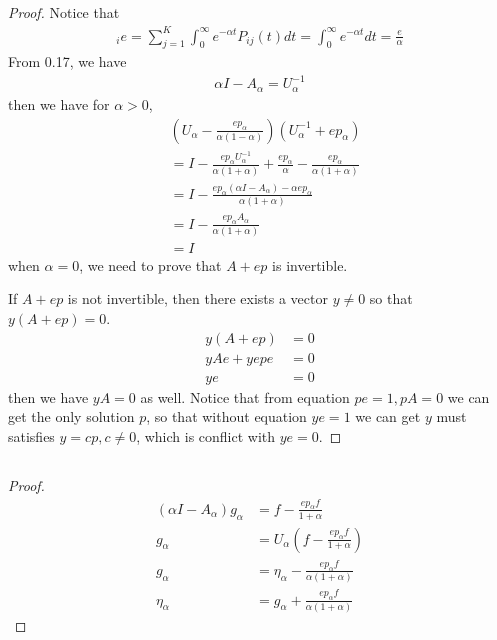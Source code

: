 \documentclass[runningheads]{llncs}
\begin{document}
    \subsection{}
    \begin{proof}
        Notice that
        \begin{align}
            [U_\alpha]_i e = \sum_{j=1}^K \int_0^\infty e^{-\alpha t} P_{ij}(t)dt = \int_0^\infty e^{-\alpha t} dt = \frac{e}{\alpha}
        \end{align}
        From 0.17, we have
        \begin{align}
            \alpha I - A_\alpha = U_\alpha^{-1}
        \end{align}
        then we have for $\alpha > 0$,
        \begin{align}
            &( U_\alpha - \frac{ep_\alpha}{\alpha(1 - \alpha)}) ( U_\alpha^{-1} + ep_\alpha) \\
            &= I - \frac{ep_\alpha U_\alpha^{-1}}{\alpha(1 + \alpha)} + \frac{ep_\alpha}{\alpha} - \frac{ep_\alpha}{\alpha(1+\alpha)} \\
            &= I - \frac{ep_\alpha (\alpha I - A_\alpha) - \alpha ep_\alpha }{\alpha(1 + \alpha)} \\
            &= I - \frac{ep_\alpha A_\alpha }{\alpha(1 + \alpha)} \\
            &= I
        \end{align}
        when $\alpha = 0$, we need to prove that $A + ep$ is invertible.
        \par
        If $A + ep$ is not invertible, then there exists a vector $y \neq 0$
        so that $y(A+ep) = 0$.
        \begin{align}
            y(A+ep) &= 0 \\
            yAe + yepe &= 0 \\
            ye &= 0
        \end{align}
        then we have $yA = 0$ as well.
        Notice that from equation $pe = 1, pA = 0$ we can get the only solution
        $p$, so that without equation $ye = 1$ we can get $y$ must satisfies
        $y = cp, c \neq 0$, which is conflict with $ye = 0$.

    \end{proof}
    \subsection{}
    \begin{proof}
        \begin{align}
            (\alpha I - A_\alpha) g_\alpha &= f - \frac{ep_\alpha f}{1 + \alpha} \\
            g_\alpha &= U_\alpha (f - \frac{ep_\alpha f}{1 + \alpha}) \\
            g_\alpha &= \eta_\alpha - \frac{ep_\alpha f}{\alpha (1 + \alpha)} \\
            \eta_\alpha &= g_\alpha + \frac{ep_\alpha f}{\alpha (1 + \alpha)}
        \end{align}
    \end{proof}
    \subsection{}
    
\end{document}
